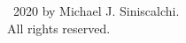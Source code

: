 
\vspace*{3in}
\begin{center}
\textcopyright\ 2020 by Michael J. Siniscalchi.\\
All rights reserved.
\end{center}